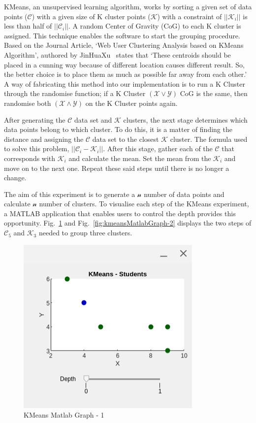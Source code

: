 \documentclass[conference]{IEEEtran}
\begin{document}
      KMeans, an unsupervised learning algorithm, works by sorting a given set of data points ($\mathcal{C}$) with a given size of K cluster points ($\mathcal{K}$) with a constraint of $\left||\mathcal{K}_{i}\right||$ is less than half of $\left||\mathcal{C}_{i}\right||$. A random Center of Gravity (CoG) to each K cluster is assigned. This technique enables the software to start the grouping procedure. Based on the Journal Article, `Web User Clustering Analysis based on KMeans Algorithm', authored by JinHuaXu~\cite{jinhuaxu_web_2010} states that `These centroids should be placed in a cunning way because of different location causes different result. So, the better choice is to place them as much as possible far away from each other.' A way of fabricating this method into our implementation is to run a K Cluster through the randomise function; if a K Cluster $(\mathcal{X} \vee \mathcal{Y})$ CoG is the same, then randomise both $(\mathcal{X} \wedge \mathcal{Y})$ on the K Cluster points again.

      After generating the $\mathcal{C}$ data set and $\mathcal{K}$ clusters, the next stage determines which data points belong to which cluster. To do this, it is a matter of finding the distance and assigning the $\mathcal{C}$ data set to the closest $\mathcal{K}$ cluster. The formula used to solve this problem, $\left||\mathcal{C}_{i} - \mathcal{K}_{i}\right||$. After this stage, gather each of the $\mathcal{C}$ that corresponds with $\mathcal{K}_{i}$ and calculate the mean. Set the mean from the $\mathcal{K}_{i}$ and move on to the next one. Repeat these said steps until there is no longer a change.

      The aim of this experiment is to generate a $\mathcal{n}$ number of data points and calculate $\mathcal{n}$ number of clusters. To visualise each step of the KMeans experiment, a MATLAB application that enables users to control the depth provides this opportunity. Fig.~\ref{fig:kmeansMatlabGraph-1} and Fig.~\ref{fig:kmeansMatlabGraph-2} displays the two steps of $\mathcal{C}_{5}$ and $\mathcal{K}_{3}$ needed to group three clusters.
      \begin{figure}[ht]
        \centering
        \includegraphics[width=0.65\columnwidth]{Figures/fig4.png}
        \caption{KMeans Matlab Graph - 1}
        \label{fig:kmeansMatlabGraph-1}
      \end{figure}
\end{document}
